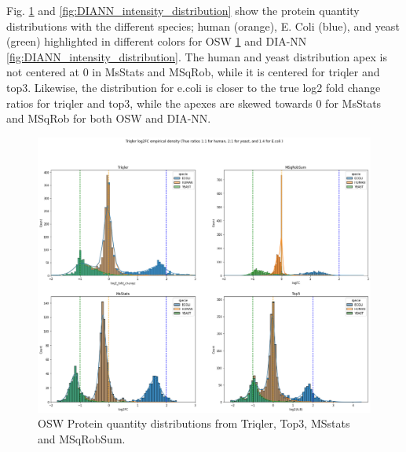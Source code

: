 \documentclass[10pt,letterpaper]{article}
\begin{document}
Fig. \ref{fig:intensity_distribution} and \ref{fig:DIANN_intensity_distribution} show the protein quantity distributions with the different species; human (orange), E. Coli (blue), and yeast (green) highlighted in different colors for OSW \ref{fig:intensity_distribution} and DIA-NN \ref{fig:DIANN_intensity_distribution}. The human and yeast distribution apex is not centered at 0 in MsStats and MSqRob, while it is centered for triqler and top3. Likewise, the distribution for e.coli is closer to the true log2 fold change ratios for triqler and top3, while the apexes are skewed towards 0 for MsStats and MSqRob for both OSW and DIA-NN.     

\begin{figure}[H]
    \centering
    \includegraphics[width=16cm]{../../result/2021-08-13_docs_plots/intensity_plot.png}
    \caption{OSW Protein quantity distributions from Triqler, Top3, MSstats and MSqRobSum.}
    \label{fig:intensity_distribution}
\end{figure}
\end{document}

